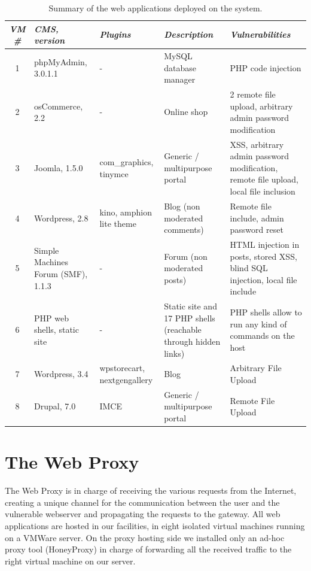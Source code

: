 \begin{table}[tbh] %
\begin{center}
\begin{tabularx}{\textwidth}{|c|X|X|X|X|}
\hline
\textit{VM \#} & \textit{CMS, version} & \textit{Plugins} & \textit{Description} & \textit{Vulnerabilities} \\
\hline
1 & phpMyAdmin, 3.0.1.1 & - & MySQL database manager & PHP code injection \\
2 & osCommerce, 2.2 & - & Online shop & 2 remote file upload, arbitrary admin password modification \\
3 & Joomla, 1.5.0 & com\_graphics, tinymce & Generic / multipurpose portal & XSS, arbitrary admin password modification, remote file upload, local file inclusion \\
4 & Wordpress, 2.8 & kino, amphion lite theme & Blog (non moderated comments) & Remote file include, admin password reset \\
5 & Simple Machines Forum (SMF), 1.1.3 & - & Forum (non moderated posts) & HTML injection in posts, stored XSS, blind SQL injection, local file include \\
6 & PHP web shells, static site & - & Static site and 17 PHP shells (reachable through hidden links) & PHP shells allow to run any kind of commands on the host \\
7 & Wordpress, 3.4 & wpstorecart, nextgengallery & Blog & Arbitrary File Upload \\
8 & Drupal, 7.0 & IMCE & Generic / multipurpose portal & Remote File Upload \\
\hline
\end{tabularx}
\caption{Summary of the web applications deployed on the system.\label{tab:webapps}}
\end{center}
\end{table}

\section{The Web Proxy}

The Web Proxy is in charge of receiving the various requests from the Internet, creating a unique channel for the communication between the user and the vulnerable webserver and propagating the requests to the gateway.
All web applications are hosted in our facilities, in eight isolated virtual machines running on a VMWare server. On the proxy hosting side we installed only an ad-hoc proxy tool (HoneyProxy) in charge of forwarding all the received traffic to the right virtual machine on our server.

